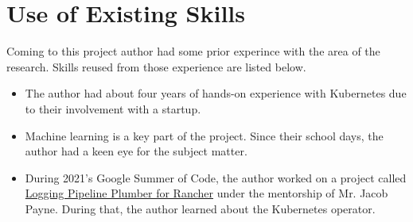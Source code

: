 \section{Use of Existing Skills}

Coming to this project author had some prior experince with the area of the research. Skills reused from those experience are listed below.

\begin{itemize}[noitemsep,nolistsep]
    \item The author had about four years of hands-on experience with Kubernetes due to their involvement with a startup.
    \item Machine learning is a key part of the project. Since their school days, the author had a keen eye for the subject matter.
    \item During 2021's Google Summer of Code, the author worked on a project called \href{https://github.com/MrSupiri/rancher-logging-pipeline-plumber}{Logging Pipeline Plumber for Rancher} under the mentorship of Mr. Jacob Payne. During that, the author learned about the Kubernetes operator.
\end{itemize}
